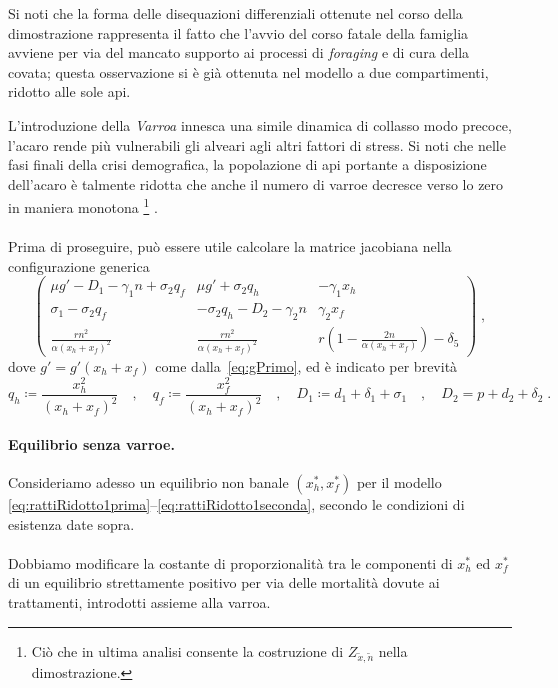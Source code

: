 Si noti che la forma delle disequazioni differenziali ottenute nel corso della dimostrazione
rappresenta il fatto che l'avvio del corso fatale della famiglia avviene per via del mancato
supporto ai processi di \emph{foraging} e di cura della covata; questa osservazione si è già
ottenuta nel modello a due compartimenti, ridotto alle sole api.

L'introduzione della \emph{Varroa} innesca una simile dinamica di collasso modo precoce,
\ie l'acaro rende più vulnerabili gli alveari agli altri fattori di stress.
Si noti che nelle fasi finali della crisi demografica, la popolazione di api portante
a disposizione dell'acaro è talmente ridotta che anche il numero di varroe
decresce verso lo zero in maniera monotona
\footnote{Ciò che in ultima analisi consente la costruzione di
    $Z_{\tilde{x}, \tilde{n}}$ nella dimostrazione.}
.

\paragraph{}
Prima di proseguire, può essere utile calcolare la matrice jacobiana nella configurazione
generica
\begin{equation}
    \begin{pmatrix}
    \mu g' - D_1 -\gamma_1 n + \sigma_2 q_f &
    \mu g' + \sigma_2 q_h &
    -\gamma_1 x_h
    \\
    \sigma_1 - \sigma_2 q_f &
    - \sigma_2 q_h - D_2 - \gamma_2 n &
    \gamma_2 x_f
    \\
    \frac{ r n^2 }{ \alpha (x_h + x_f)^2 } &
    \frac{ r n^2 }{ \alpha (x_h + x_f)^2 } &
    r \left(1-\frac{2n}{\alpha (x_h+x_f)} \right) -\delta_5
    \end{pmatrix}
    \; ,
\end{equation}
dove $g' = g'(x_h +x_f)$ come dalla~\eqref{eq:gPrimo}, ed è indicato per brevità
$$q_h \coloneq \frac{x_h^2}{(x_h+x_f)^2} \quad , \quad q_f \coloneq \frac{x_f^2}{(x_h+x_f)^2}
\quad , \quad D_1 \coloneq d_1 +\delta_1 +\sigma_1 \quad , \quad D_2 =  p +d_2 +\delta_2
\; .$$


\paragraph{Equilibrio senza varroe. } Consideriamo adesso un equilibrio non banale $(x_h^*, x_f^*)$ per il modello \eqref{eq:rattiRidotto1prima}--\eqref{eq:rattiRidotto1seconda}, secondo le condizioni di esistenza date sopra.

\paragraph{}
Dobbiamo modificare la costante di proporzionalità tra le componenti di $x_h^*$ ed $x_f^*$ di un equilibrio
strettamente positivo per via delle mortalità dovute ai trattamenti, introdotti assieme alla varroa.

